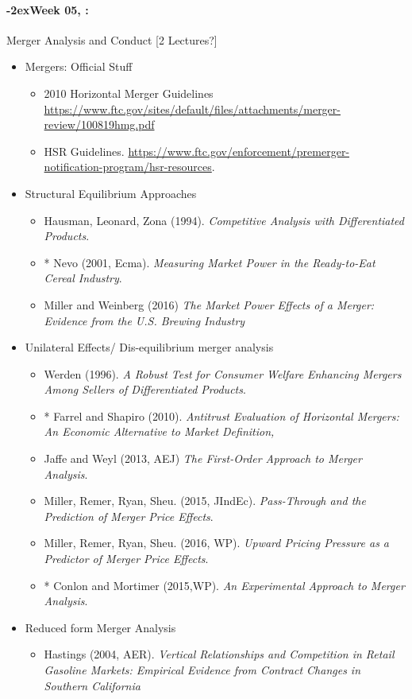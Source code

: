 \documentclass[11pt]{article}
\newcommand{\week}[1]{%
  \paragraph*{\kern-2ex\quad #1, \syldate{\today}:}%
  \ifdim\wd1=\wd\THURSDAY
    \AdvanceDate[7]
  \else
    \AdvanceDate[7]
  \fi%
}
\begin{document}
\week{Week 05} Merger Analysis and Conduct [2 Lectures?]
\begin{itemize}
\item Mergers: Official Stuff
\begin{itemize}
\item 2010 Horizontal Merger Guidelines \url{https://www.ftc.gov/sites/default/files/attachments/merger-review/100819hmg.pdf}
\item HSR Guidelines. \url{https://www.ftc.gov/enforcement/premerger-notification-program/hsr-resources}.
\end{itemize}
\item Structural Equilibrium Approaches
\begin{itemize}
\item Hausman, Leonard, Zona (1994). \textit{Competitive Analysis with Differentiated Products}.
\item * Nevo (2001, Ecma). \textit{Measuring Market Power in the Ready-to-Eat Cereal Industry}.
\item Miller and Weinberg (2016) \textit{The Market Power Effects of a Merger: Evidence from the U.S. Brewing Industry}
\end{itemize}
\item Unilateral Effects/ Dis-equilibrium merger analysis
\begin{itemize}
\item Werden (1996). \textit{A Robust Test for Consumer Welfare Enhancing
Mergers Among Sellers of Differentiated Products}.
\item * Farrel and Shapiro (2010). \textit{Antitrust Evaluation of Horizontal Mergers: An Economic Alternative to Market Definition,}
\item Jaffe and Weyl (2013, AEJ) \textit{The First-Order Approach to Merger Analysis}.
\item Miller, Remer, Ryan, Sheu. (2015, JIndEc). \textit{Pass-Through and the Prediction of Merger Price Effects}.
\item Miller, Remer, Ryan, Sheu. (2016, WP). \textit{Upward Pricing Pressure as a Predictor of Merger Price Effects}.
\item * Conlon and Mortimer (2015,WP). \textit{An Experimental Approach to Merger Analysis}.
\end{itemize}
\item Reduced form Merger Analysis
\begin{itemize}
\item Hastings (2004, AER). \textit{Vertical Relationships and Competition in Retail Gasoline Markets: Empirical Evidence from Contract Changes in Southern California}

\end{itemize}
\end{itemize}
\end{document}
